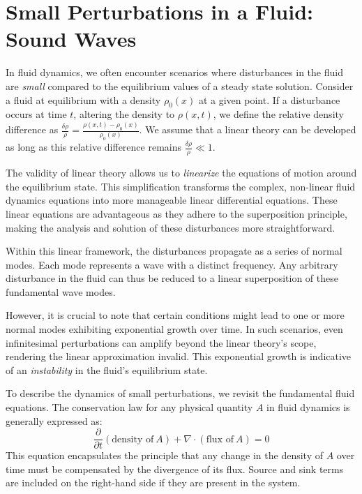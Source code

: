 \section{Small Perturbations in a Fluid: Sound Waves}

In fluid dynamics, we often encounter scenarios where disturbances in the fluid are \emph{small} compared to the equilibrium values of a steady state solution. 
%
Consider a fluid at equilibrium with a density \(\rho_0(x)\) at a given point. If a disturbance occurs at time \(t\), altering the density to \(\rho(x, t)\), we define the relative density difference as \( \frac{\delta \rho}{\rho} = \frac{\rho(x, t) - \rho_0(x)}{\rho_0(x)} \). 
%
We assume that a linear theory can be developed as long as this relative difference remains  \( \frac{\delta \rho}{\rho} \ll 1 \).

The validity of linear theory allows us to \emph{linearize} the equations of motion around the equilibrium state. This simplification transforms the complex, non-linear fluid dynamics equations into more manageable linear differential equations. These linear equations are advantageous as they adhere to the superposition principle, making the analysis and solution of these disturbances more straightforward.

Within this linear framework, the disturbances propagate as a series of normal modes. Each mode represents a wave with a distinct frequency. Any arbitrary disturbance in the fluid can thus be reduced to a linear superposition of these fundamental wave modes. 

However, it is crucial to note that certain conditions might lead to one or more normal modes exhibiting exponential growth over time. In such scenarios, even infinitesimal perturbations can amplify beyond the linear theory's scope, rendering the linear approximation invalid. This exponential growth is indicative of an \emph{instability} in the fluid's equilibrium state.

To describe the dynamics of small perturbations, we revisit the fundamental fluid equations. 
%
The conservation law for any physical quantity \(A\) in fluid dynamics is generally expressed as:
%
\[
\frac{\partial}{\partial t} (\text{density of}~A) + \nabla \cdot (\text{flux of}~A) = 0
\]
%
This equation encapsulates the principle that any change in the density of \(A\) over time must be compensated by the divergence of its flux. Source and sink terms are included on the right-hand side if they are present in the system.

